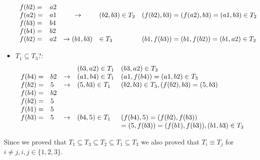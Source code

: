 \begin{exercise}{5}
\begin{subexercise}
\begin{itemize}
\begin{displaymath}
\begin{array}{ l l c l l }
        f(b2) = & a2 & & & \\
        f(a2) = & a1 & \rightarrow & (b2,b3)\in T_3 & (f(b2),b3) = (f(a2),b3) =
        (a1,b3) \in T_2\\

        f(b3) = & b4 & & & \\
        f(b4) = & b2 & & & \\
        f(b2) = & a2 & \rightarrow (b1,b3) & \in T_3 & (b1,f(b3)) = (b1,f(b2)) =
        (b1,a2) \in T_2
      \end{array}
    \end{displaymath}
    \item $T_1\subseteq T_3$?:
    \begin{displaymath}
      \begin{array}{ l l c l l }
        & & & (b3,a2)\in T_1 & (b3,a2)\in T_3\\
        f(b4) = & b2 & \rightarrow &(a1,b4) \in T_1 & (a1, f(b4)) = (a1, b2)\in
        T_3 \\

        f(b2)= & 5 & \rightarrow &(5,b3) \in T_1 & (b2,b3)\in T_3, (f(b2),b3) =
        (5,b3)\\

        f(b4) =& b2 & & & \\
        f(b2) =& 5 & & & \\
        f(b1) =& 5 & & & \\
        f(b3) =& 5 & \rightarrow & (b4,5)\in T_1 & (f(b4),5) = (f(b2),f(b3))\\
        & & & & =(5,f(b3)) = (f(b1),f(b3)), (b1,b3)\in T_3
      \end{array}
    \end{displaymath}
  \end{itemize}
  Since we proved that $T_1\subseteq T_3 \subseteq T_2 \subseteq T_1 \subseteq
  T_3$ we also proved that $T_i \equiv T_j$ for $i\neq j,i,j\in\{1,2,3\}$.
\end{subexercise}


\end{exercise}
